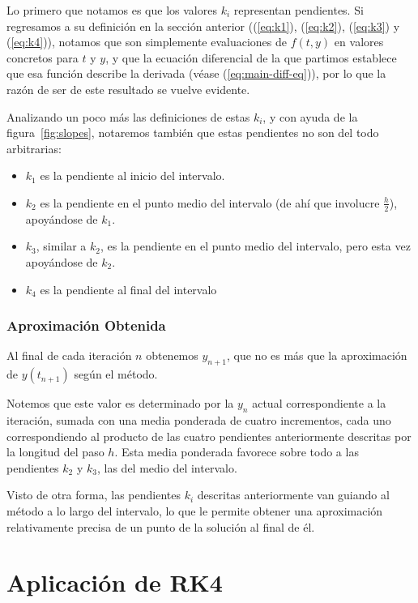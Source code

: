 \documentclass[12pt, a4paper]{article}
\begin{document}
Lo primero que notamos es que los valores \(k_{i}\) representan pendientes. Si regresamos a su definición en la sección anterior ((\ref{eq:k1}), (\ref{eq:k2}), (\ref{eq:k3}) y (\ref{eq:k4})), notamos que son simplemente evaluaciones de \(f(t,y)\) en valores concretos para \(t\) y \(y\), y que la ecuación diferencial de la que partimos establece que esa función describe la derivada (véase (\ref{eq:main-diff-eq})), por lo que la razón de ser de este resultado se vuelve evidente.

Analizando un poco más las definiciones de estas \(k_{i}\), y con ayuda de la figura~\ref{fig:slopes}, notaremos también que estas pendientes no son del todo arbitrarias:
\begin{itemize}
	\item \(k_{1}\) es la pendiente al inicio del intervalo.
	\item \(k_{2}\) es la pendiente en el punto medio del intervalo (de ahí que involucre \(\frac{h}{2}\)), apoyándose de \(k_{1}\).
	\item \(k_{3}\), similar a \(k_{2}\), es la pendiente en el punto medio del intervalo, pero esta vez apoyándose de \(k_{2}\).
	\item \(k_{4}\) es la pendiente al final del intervalo
\end{itemize}

\subsubsection{Aproximación Obtenida}

Al final de cada iteración \(n\) obtenemos \(y_{n+1}\), que no es más que la aproximación de \(y(t_{n+1})\) según el método.

Notemos que este valor es determinado por la \(y_{n}\) actual correspondiente a la iteración, sumada con una media ponderada de cuatro incrementos, cada uno correspondiendo al producto de las cuatro pendientes anteriormente descritas por la longitud del paso \(h\). Esta media ponderada favorece sobre todo a las pendientes \(k_{2}\) y \(k_{3}\), las del medio del intervalo.

Visto de otra forma, las pendientes \(k_{i}\) descritas anteriormente van guiando al método a lo largo del intervalo, lo que le permite obtener una aproximación relativamente precisa de un punto de la solución al final de él.

\section{Aplicación de RK4}
\end{document}
